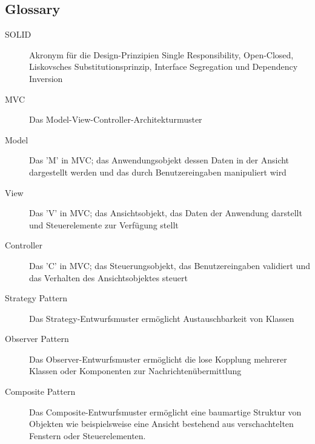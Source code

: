 \documentclass{vldb}
\begin{document}
\balance




\subsection{Glossary}
\begin{description}
  \item[SOLID] Akronym für die Design-Prinzipien Single Responsibility, Open-Closed, Liskovsches Substitutionsprinzip, Interface Segregation und Dependency Inversion
  \item[MVC] Das Model-View-Controller-Architekturmuster
  \item[Model] Das 'M' in MVC; das Anwendungsobjekt dessen Daten in der Ansicht dargestellt werden und das durch Benutzereingaben manipuliert wird
  \item[View] Das 'V' in MVC; das Ansichtsobjekt, das Daten der Anwendung darstellt und Steuerelemente zur Verfügung stellt
  \item[Controller] Das 'C' in MVC; das Steuerungsobjekt, das Benutzereingaben validiert und das Verhalten des Ansichtsobjektes steuert
  \item[Strategy Pattern] Das Strategy-Entwurfsmuster er\-mög\-licht Austauschbarkeit von Klassen
  \item[Observer Pattern] Das Observer-Entwurfsmuster er\-mög\-licht die lose Kopplung mehrerer Klassen oder Komponenten zur Nachrichtenübermittlung
  \item[Composite Pattern] Das Composite-Entwurfsmuster er\-mög\-licht eine baumartige Struktur von Objekten wie beispielsweise eine Ansicht bestehend aus verschachtelten Fenstern oder Steuerelementen.
\end{description}

\end{document}
